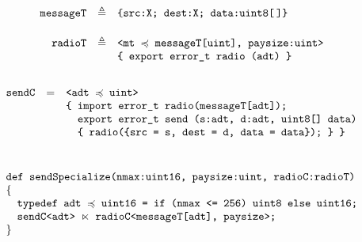 
$$
\begin{array}{rcl}
\texttt{messageT} &\triangleq& \texttt{\{src:X; dest:X; data:uint8[\,]\}} \\[5mm]
\texttt{radioT} &\triangleq& \texttt{<mt $\preccurlyeq$ messageT[uint], paysize:uint>} \\
 & & \texttt{\{\ export\  error\_t\ radio (adt)\ \}}\\[5mm]
\end{array} 
$$
$$
\begin{array}{lcl}
\texttt{sendC} & = & \texttt{<adt $\subtype$ uint>}\\
&& \texttt{\{ import error\_t radio(messageT[adt]);}\\
&& \texttt{\phantom{\{ }export error\_t send (s:adt, d:adt, uint8[] data)}\\
&& \texttt{\phantom{\{ }\{ radio(\{src = s, dest = d, data = data\}); \}\ \}}\\[10mm]
\multicolumn{3}{l}{\texttt{def sendSpecialize(nmax:uint16, paysize:uint, radioC:radioT)}}\\
\{\\
\multicolumn{3}{l}{\quad \texttt{typedef adt $\subtype$ uint16 = if (nmax <= 256) uint8 else uint16;}}\\
\multicolumn{3}{l}{\quad \texttt{sendC<adt> $\ltimes$ radioC<messageT[adt], paysize>;}}\\
\}
\end{array}
$$

\stopslide


